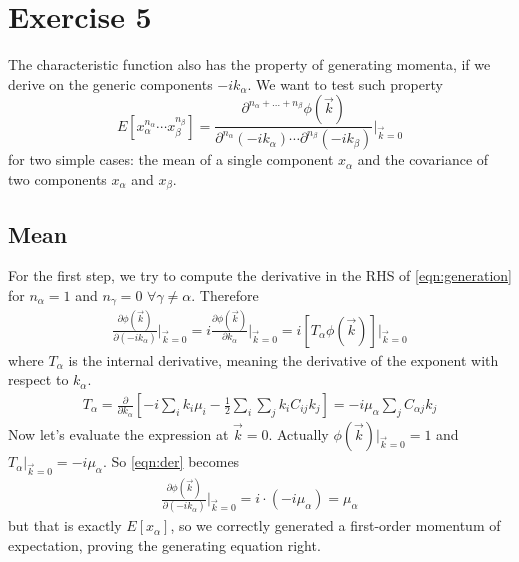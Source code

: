 \documentclass[a4paper,11pt,fleqn]{article}
\begin{document}


\section{Exercise 5}

The characteristic function also has the property of generating momenta, if 
we derive on the generic components $-ik_{\alpha}$. We want to test such 
property 
\begin{equation}
    \label{eqn:generation}
    E[x_{\alpha}^{n_{\alpha}} \dotsm x_{\beta}^{n_{\beta}}] = \frac{\partial^{n_\alpha+\dots+n_{\beta}}\phi(\vec{k})}{\partial^{n_\alpha}(-ik_{\alpha})\dotsm \partial^{n_\beta}(-ik_{\beta})}\Big|_{\vec{k}=0}
\end{equation}
for two simple cases: the mean of a single component $x_{\alpha}$ and the 
covariance of two components $x_{\alpha}$ and $x_{\beta}$.

\subsection{Mean}
For the first step, we try to compute the derivative in the RHS of 
\ref{eqn:generation} for $n_{\alpha}=1$ and $n_{\gamma}=0$ 
$\forall \gamma \neq \alpha$. Therefore 
\begin{gather}
    \label{eqn:der}
    \frac{\partial \phi(\vec{k})}{\partial(-ik_{\alpha})}\Big|_{\vec{k}=0} = i \frac{\partial \phi(\vec{k})}{\partial k_{\alpha}}\Big|_{\vec{k}=0} = i \left[T_{\alpha}\phi(\vec{k})\right]\Big|_{\vec{k}=0}
\end{gather}
where $T_{\alpha}$ is the internal derivative, meaning the derivative of the 
exponent with respect to $k_{\alpha}$.
\begin{gather*}
    T_{\alpha} = \frac{\partial}{\partial k_{\alpha}}\left[-i\sum_i k_i \mu_i -\frac{1}{2}\sum_i \sum_j k_i C_{ij}k_j\right] = -i\mu_{\alpha} \sum_jC_{\alpha j}k_j
\end{gather*}
Now let's evaluate the expression at $\vec{k}=0$. Actually $\phi(\vec{k})|_{\vec{k}=0}=1$
and $T_{\alpha}|_{\vec{k}=0}=-i\mu_{\alpha}$. So \ref{eqn:der} becomes
\begin{gather*}
    \frac{\partial \phi(\vec{k})}{\partial(-ik_{\alpha})}\Big|_{\vec{k}=0} = i \cdot (-i\mu_{\alpha}) = \mu_{\alpha}
\end{gather*}
but that is exactly $E[x_{\alpha}]$, so we correctly generated a first-order 
momentum of expectation, proving the generating equation right.
\end{document}
